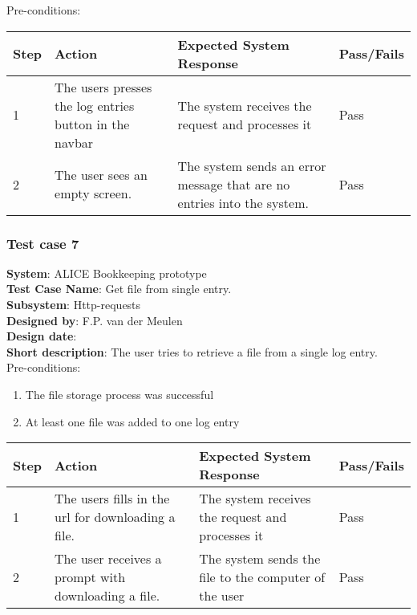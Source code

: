 Pre-conditions: \\

\begin{longtable}{ | p{0.8cm} | p{4.5cm} | p{6cm} | p{1.5cm} |}
\hline
Step & Action & Expected System Response & Pass/Fails  \\ \hline
1 & The users presses the log entries button in the navbar & The system receives the request and processes it & Pass \\ \hline
2 & The user sees an empty screen. & The system sends an error message that are no entries into the system. & Pass \\ \hline

\end{longtable}
\subsubsection{Test case 7}
\textbf{System}:  ALICE Bookkeeping prototype \\
\textbf{Test Case Name}:  Get file from single entry. \\
\textbf{Subsystem}:  Http-requests \\
\textbf{Designed by}:  F.P. van der Meulen\\
\textbf{Design date}:  \\
\textbf{Short description}: The user tries to retrieve a file from a single log entry. \\

Pre-conditions: \\
\begin{enumerate}
\item The file storage process was successful
\item At least one file was added to one log entry
\end{enumerate}

\begin{longtable}{ | p{0.8cm} | p{4.5cm} | p{6cm} | p{1.5cm} |}
\hline
Step & Action & Expected System Response & Pass/Fails  \\ \hline
1 & The users fills in the url for downloading a file. & The system receives the request and processes it & Pass \\ \hline
2 & The user receives a prompt with downloading a file. & The system sends the file to the computer of the user & Pass
\end{longtable}
